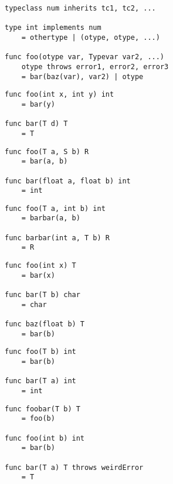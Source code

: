 \documentclass{acm_proc_article-sp}
\begin{document}
\begin{lstlisting}[caption=Grammar displayed informally,language=Paratype]
typeclass num inherits tc1, tc2, ...

type int implements num
    = othertype | (otype, otype, ...)

func foo(otype var, Typevar var2, ...)
    otype throws error1, error2, error3
    = bar(baz(var), var2) | otype
\end{lstlisting}

\begin{lstlisting}[caption=Explicit context provided by parents,language=Paratype]
func foo(int x, int y) int
    = bar(y)

func bar(T d) T
    = T
\end{lstlisting}

\begin{lstlisting}[caption=Explicit context provided by child,language=Paratype]
func foo(T a, S b) R
    = bar(a, b)

func bar(float a, float b) int
    = int
\end{lstlisting}

\begin{lstlisting}[caption=Explicit context provided by child and parent,language=Paratype]
func foo(T a, int b) int
    = barbar(a, b)

func barbar(int a, T b) R
    = R
\end{lstlisting}

\begin{lstlisting}[caption=Need to maintain partial contexts,language=Paratype]
func foo(int x) T
    = bar(x)

func bar(T b) char
    = char

func baz(float b) T
    = bar(b)
\end{lstlisting}

\begin{lstlisting}[caption=Unhalting context resolution,language=Paratype]
func foo(T b) int
    = bar(b)

func bar(T a) int
    = int
\end{lstlisting}

\begin{lstlisting}[caption=Errors,language=Paratype]
func foobar(T b) T
    = foo(b)

func foo(int b) int
    = bar(b)

func bar(T a) T throws weirdError
    = T
\end{lstlisting}
\end{document}

